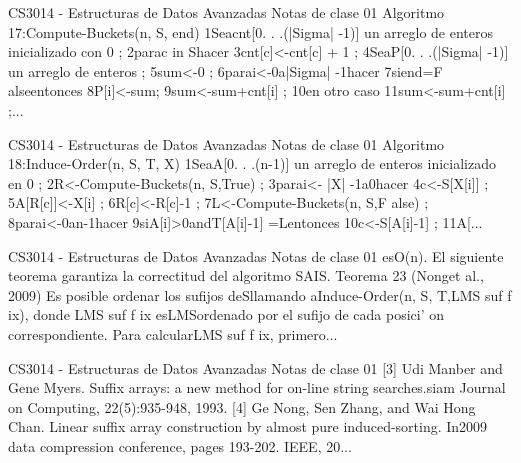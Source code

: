 \begin{description}[leftmargin=!,labelwidth=4.2em,style=nextline]
\item[Pag. 20] CS3014 - Estructuras de Datos Avanzadas Notas de clase 01 Algoritmo 17:Compute-Buckets(n, S, end) 1Seacnt[0. . .(|Sigma| -1)] un arreglo de enteros inicializado con 0 ; 2parac in Shacer 3cnt[c]<-cnt[c] + 1 ; 4SeaP[0. . .(|Sigma| -1)] un arreglo de enteros ; 5sum<-0 ; 6parai<-0a|Sigma| -1hacer 7siend=F alseentonces 8P[i]<-sum; 9sum<-sum+cnt[i] ; 10en otro caso 11sum<-sum+cnt[i] ;...
\item[Pag. 21] CS3014 - Estructuras de Datos Avanzadas Notas de clase 01 Algoritmo 18:Induce-Order(n, S, T, X) 1SeaA[0. . .(n-1)] un arreglo de enteros inicializado en 0 ; 2R<-Compute-Buckets(n, S,True) ; 3parai<- |X| -1a0hacer 4c<-S[X[i]] ; 5A[R[c]]<-X[i] ; 6R[c]<-R[c]-1 ; 7L<-Compute-Buckets(n, S,F alse) ; 8parai<-0an-1hacer 9siA[i]>0andT[A[i]-1] =Lentonces 10c<-S[A[i]-1] ; 11A[...
\item[Pag. 22] CS3014 - Estructuras de Datos Avanzadas Notas de clase 01 esO(n). El siguiente teorema garantiza la correctitud del algoritmo SAIS. Teorema 23 (Nonget al., 2009) Es posible ordenar los sufijos deSllamando aInduce-Order(n, S, T,LMS suf f ix), donde LMS suf f ix esLMSordenado por el sufijo de cada posici' on correspondiente. Para calcularLMS suf f ix, primero...
\item[Pag. 23] CS3014 - Estructuras de Datos Avanzadas Notas de clase 01 [3] Udi Manber and Gene Myers. Suffix arrays: a new method for on-line string searches.siam Journal on Computing, 22(5):935-948, 1993. [4] Ge Nong, Sen Zhang, and Wai Hong Chan. Linear suffix array construction by almost pure induced-sorting. In2009 data compression conference, pages 193-202. IEEE, 20...
\end{description}
